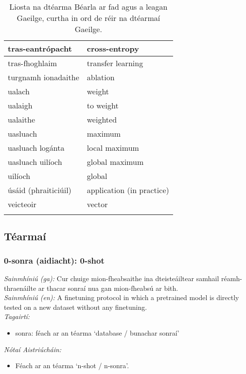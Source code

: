 \begin{longtable}{|l|l|}
		tras-eantrópacht&cross-entropy\\ \hline 
		tras-fhoghlaim&transfer learning\\ \hline 
		turgnamh ionadaithe&ablation\\ \hline 
		ualach&weight\\ \hline 
		ualaigh&to weight\\ \hline 
		ualaithe&weighted\\ \hline 
		uasluach&maximum\\ \hline 
		uasluach logánta&local maximum\\ \hline 
		uasluach uilíoch&global maximum\\ \hline 
		uilíoch&global\\ \hline 
		úsáid (phraiticiúil)&application (in practice)\\ \hline 
		veicteoir&vector\\ \hline 
\caption{Liosta na dtéarma Béarla ar fad agus a leagan Gaeilge, curtha in ord de réir na dtéarmaí Gaeilge.}
\label{tab-terms-ga-en}
\end{longtable}

\newpage \subsection{Téarmaí}
\subsubsection*{0-sonra (aidiacht): 0-shot}
 \noindent \textit{Sainmhíniú (ga):} Cur chuige mion-fheabsaithe ina dteisteáiltear samhail réamh-thraenáilte ar thacar sonraí nua gan mion-fheabsú ar bith.
\\
 \noindent \textit{Sainmhíniú (en):} A finetuning protocol in which a pretrained model is directly tested on a new dataset without any finetuning.
\\
 \noindent \textit{Tagairtí:}
\begin{itemize}
	\item sonra: féach ar an téarma `database / bunachar sonraí'
\end{itemize}

 \noindent \textit{Nótaí Aistriúcháin:}
\begin{itemize}
	\item Féach ar an téarma `n-shot / n-sonra'.
\end{itemize}


